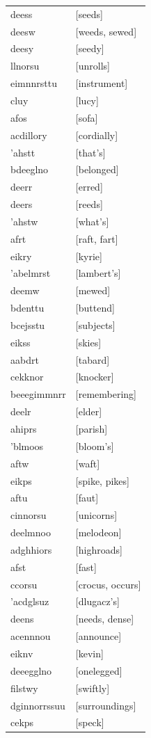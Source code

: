 \documentclass{article}
\begin{document}
\begin{tabular}{ll}
deess & [seeds] \\
deesw & [weeds, sewed] \\
deesy & [seedy] \\
llnorsu & [unrolls] \\
eimnnrsttu & [instrument] \\
cluy & [lucy] \\
afos & [sofa] \\
acdillory & [cordially] \\
'ahstt & [that's] \\
bdeeglno & [belonged] \\
deerr & [erred] \\
deers & [reeds] \\
'ahstw & [what's] \\
afrt & [raft, fart] \\
eikry & [kyrie] \\
'abelmrst & [lambert's] \\
deemw & [mewed] \\
bdenttu & [buttend] \\
bcejsstu & [subjects] \\
eikss & [skies] \\
aabdrt & [tabard] \\
cekknor & [knocker] \\
beeegimmnrr & [remembering] \\
deelr & [elder] \\
ahiprs & [parish] \\
'blmoos & [bloom's] \\
aftw & [waft] \\
eikps & [spike, pikes] \\
aftu & [faut] \\
cinnorsu & [unicorns] \\
deelmnoo & [melodeon] \\
adghhiors & [highroads] \\
afst & [fast] \\
ccorsu & [crocus, occurs] \\
'acdglsuz & [dlugacz's] \\
deens & [needs, dense] \\
acennnou & [announce] \\
eiknv & [kevin] \\
deeegglno & [onelegged] \\
filstwy & [swiftly] \\
dginnorrssuu & [surroundings] \\
cekps & [speck] \\

\end{tabular}
\end{document}
